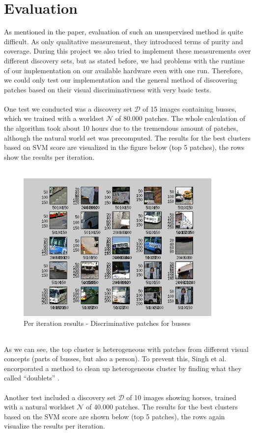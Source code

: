 \section{Evaluation}

As mentioned in the paper, evaluation of such an unsupervised method is quite difficult. As only qualitative measurement, they introduced terms of purity and coverage. During this project we also tried to implement these measurements over different discovery sets, but as stated before, we had problems with the runtime of our implementation on our available hardware even with one run.
Therefore, we could only test our implementation and the general method of discovering patches based on their visual
discriminativness with very basic tests.\\
\\
One test we conducted was a discovery set $\mathcal{D}$ of 15 images containing busses, which we trained with a worldset 
$\mathcal{N}$ of 80.000 patches. The whole calculation of the algorithm took about 10 hours due to the tremendous amount of patches, although the natural world set was precomputed. The results for the best clusters based on SVM score are visualized in the figure below (top 5 patches), 
the rows show the results per iteration.\\
\\
\begin{figure}[h!]
\centering
\includegraphics[width=0.9\textwidth]{figures/busses.png}
\caption{Per iteration results - Discriminative patches for busses}
\end{figure}
\\
As we can see, the top cluster is heterogeneous with patches from different visual concepts (parts of busses, but also a person).
To prevent this, Singh et al. encorporated a method to clean up heterogeneous cluster by finding what they called ``doublets'' \cite{Singh2012DiscPat}.\\
\\
Another test included a discovery set $\mathcal{D}$ of 10 images showing horses, trained with a natural worldset $\mathcal{N}$ of 40.000 patches.
The results for the best clusters based on the SVM score are shown below (top 5 patches), the rows again visualize the results per iteration.

